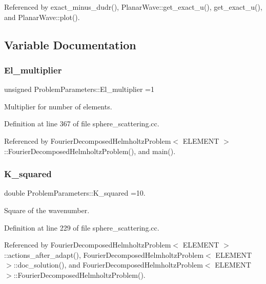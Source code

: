 Referenced by exact\+\_\+minus\+\_\+dudr(), Planar\+Wave\+::get\+\_\+exact\+\_\+u(), get\+\_\+exact\+\_\+u(), and Planar\+Wave\+::plot().



\subsection{Variable Documentation}
\mbox{\label{namespaceProblemParameters_a23b618b9e3a0d282fd91aa3f3f7b9254}} 
\subsubsection{\texorpdfstring{El\+\_\+multiplier}{El\_multiplier}}
{\footnotesize\ttfamily unsigned Problem\+Parameters\+::\+El\+\_\+multiplier =1}



Multiplier for number of elements. 



Definition at line 367 of file sphere\+\_\+scattering.\+cc.



Referenced by Fourier\+Decomposed\+Helmholtz\+Problem$<$ E\+L\+E\+M\+E\+N\+T $>$\+::\+Fourier\+Decomposed\+Helmholtz\+Problem(), and main().

\mbox{\label{namespaceProblemParameters_aa5362de1af9e257fde4317c367158a93}} 
\subsubsection{\texorpdfstring{K\+\_\+squared}{K\_squared}}
{\footnotesize\ttfamily double Problem\+Parameters\+::\+K\+\_\+squared =10.}



Square of the wavenumber. 



Definition at line 229 of file sphere\+\_\+scattering.\+cc.



Referenced by Fourier\+Decomposed\+Helmholtz\+Problem$<$ E\+L\+E\+M\+E\+N\+T $>$\+::actions\+\_\+after\+\_\+adapt(), Fourier\+Decomposed\+Helmholtz\+Problem$<$ E\+L\+E\+M\+E\+N\+T $>$\+::doc\+\_\+solution(), and Fourier\+Decomposed\+Helmholtz\+Problem$<$ E\+L\+E\+M\+E\+N\+T $>$\+::\+Fourier\+Decomposed\+Helmholtz\+Problem().

